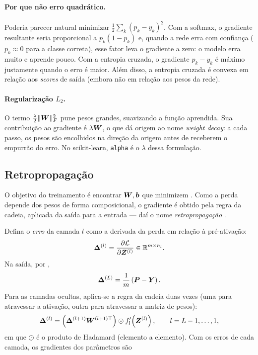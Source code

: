 \paragraph{Por que não erro quadrático.} Poderia parecer natural minimizar
$\frac{1}{2}\sum_k (p_k-y_k)^2$. Com a softmax, o gradiente resultante seria proporcional a
$p_k(1-p_k)$ e, quando a rede erra com confiança ($p_k \approx 0$ para a classe correta), esse fator
leva o gradiente a zero: o modelo erra muito e aprende pouco. Com a entropia cruzada, o gradiente
$p_k - y_k$ é máximo justamente quando o erro é maior. Além disso, a entropia cruzada é convexa
em relação aos \emph{scores} de saída (embora não em relação aos pesos da rede).

\paragraph{Regularização $L_2$.} O termo $\frac{\lambda}{2}\|\bm{W}\|_F^2$ pune pesos grandes,
suavizando a função aprendida. Sua contribuição ao gradiente é $\lambda\bm{W}$, o que dá origem ao
nome \emph{weight decay}: a cada passo, os pesos são encolhidos na direção da origem antes de
receberem o empurrão do erro. No scikit-learn, \texttt{alpha} é o $\lambda$ dessa formulação.

\subsection{Retropropagação}
\label{sec:backprop}

O objetivo do treinamento é encontrar $\bm{W},\bm{b}$ que minimizem . Como a
perda depende dos pesos de forma composicional, o gradiente é obtido pela regra da cadeia,
aplicada da saída para a entrada --- daí o nome \emph{retropropagação}
\cite{rumelhart1986}.

Defina o \emph{erro} da camada $l$ como a derivada da perda em relação à pré-ativação:
\begin{equation}
	\bm{\Delta}^{(l)} = \frac{\partial \mathcal{L}}{\partial \bm{Z}^{(l)}} \in \mathbb{R}^{m\times n_l}.
	\label{eq:delta}
\end{equation}
Na saída, por ,
\begin{equation}
	\bm{\Delta}^{(L)} = \frac{1}{m}\left(\bm{P} - \bm{Y}\right).
	\label{eq:delta-L}
\end{equation}
Para as camadas ocultas, aplica-se a regra da cadeia duas vezes (uma para atravessar a ativação,
outra para atravessar a matriz de pesos):
\begin{equation}
	\bm{\Delta}^{(l)} = \left(\bm{\Delta}^{(l+1)}\bm{W}^{(l+1)\top}\right) \odot f_l'\!\left(\bm{Z}^{(l)}\right),
	\qquad l = L-1,\dots,1,
	\label{eq:delta-rec}
\end{equation}
em que $\odot$ é o produto de Hadamard (elemento a elemento). Com os erros de cada camada, os
gradientes dos parâmetros são

